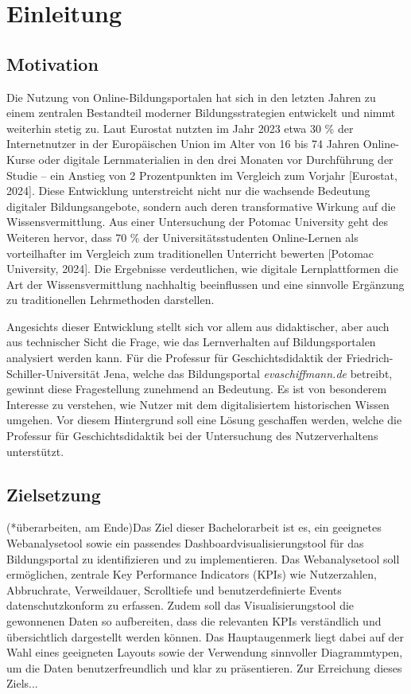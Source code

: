 \chapter{Einleitung}
\label{ch:einleitung}

\section{Motivation}
\label{sec:motivation}

Die Nutzung von Online-Bildungsportalen hat sich in den letzten Jahren zu einem zentralen Bestandteil moderner Bildungsstrategien entwickelt und nimmt weiterhin stetig zu. Laut Eurostat nutzten im Jahr 2023 etwa 30 \% der Internetnutzer in der Europäischen Union im Alter von 16 bis 74 Jahren Online-Kurse oder digitale Lernmaterialien
in den drei Monaten vor Durchführung der Studie – ein Anstieg von 2 Prozentpunkten im Vergleich zum Vorjahr [Eurostat, 2024]. Diese Entwicklung unterstreicht nicht nur die wachsende Bedeutung digitaler Bildungsangebote, sondern auch deren transformative Wirkung auf die Wissensvermittlung. Aus einer Untersuchung der Potomac University geht des Weiteren hervor, dass 70 \% der Universitätsstudenten Online-Lernen als vorteilhafter im Vergleich zum traditionellen Unterricht bewerten [Potomac University, 2024]. Die Ergebnisse verdeutlichen, wie digitale Lernplattformen die Art der Wissensvermittlung nachhaltig beeinflussen und eine sinnvolle Ergänzung zu traditionellen Lehrmethoden darstellen.

Angesichts dieser Entwicklung stellt sich vor allem aus didaktischer, aber auch aus technischer Sicht die Frage, wie das Lernverhalten auf Bildungsportalen analysiert werden kann. Für die Professur für Geschichtsdidaktik der Friedrich-Schiller-Universität Jena, welche das Bildungsportal \textit{evaschiffmann.de} betreibt, gewinnt diese Fragestellung zunehmend an Bedeutung. Es ist von besonderem Interesse zu verstehen, wie Nutzer mit dem digitalisiertem historischen Wissen umgehen. Vor diesem Hintergrund soll eine Lösung geschaffen werden, welche die Professur für Geschichtsdidaktik bei der Untersuchung des Nutzerverhaltens unterstützt.

\section{Zielsetzung}
\label{sec:zielsetzung}

(*überarbeiten, am Ende)Das Ziel dieser Bachelorarbeit ist es, ein geeignetes Webanalysetool sowie ein passendes Dashboardvisualisierungstool für das Bildungsportal zu identifizieren und zu implementieren. Das Webanalysetool soll ermöglichen, zentrale Key Performance Indicators (KPIs) wie Nutzerzahlen, Abbruchrate, Verweildauer, Scrolltiefe und benutzerdefinierte Events datenschutzkonform zu erfassen. Zudem soll das Visualisierungstool die gewonnenen Daten so aufbereiten, dass die relevanten KPIs verständlich und übersichtlich dargestellt werden können. Das Hauptaugenmerk liegt dabei auf der Wahl eines geeigneten Layouts sowie der Verwendung sinnvoller Diagrammtypen, um die Daten benutzerfreundlich und klar zu präsentieren.
Zur Erreichung dieses Ziels...

